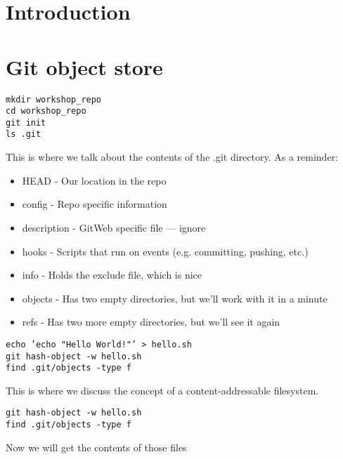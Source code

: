 \documentclass[a4paper,12pt]{article}
\begin{document}
\section*{Introduction}

\section*{Git object store}

\texttt{mkdir workshop\_repo\\
cd workshop\_repo\\
git init\\
ls .git}

\vspace{0.1in}

This is where we talk about the contents of the .git directory. As a reminder:
\begin{itemize}
  \item HEAD - Our location in the repo
  \item config - Repo specific information
  \item description - GitWeb specific file --- ignore
  \item hooks - Scripts that run on events (e.g. committing, pushing, etc.)
  \item info - Holds the exclude file, which is nice
  \item objects - Has two empty directories, but we'll work with it in a minute
  \item refs - Has two more empty directories, but we'll see it again
\end{itemize}

\vspace{0.1in}

\texttt{echo 'echo "Hello World!"' > hello.sh\\
git hash-object -w hello.sh\\
find .git/objects -type f}

\vspace{0.1in}

This is where we discuss the concept of a content-addressable filesystem.

\texttt{git hash-object -w hello.sh\\
find .git/objects -type f}

\vspace{0.1in}

Now we will get the contents of those files

\vspace{0.1in}
\end{document}
